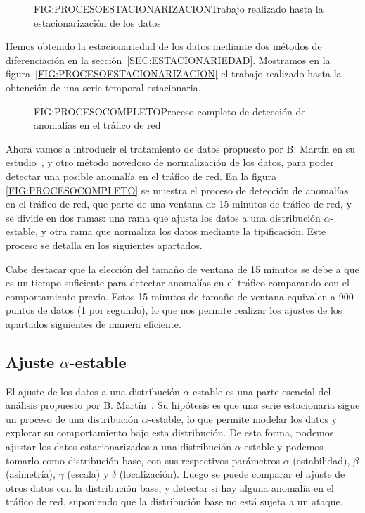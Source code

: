 
\begin{figure}[]{FIG:PROCESOESTACIONARIZACION}{Trabajo realizado hasta la estacionarización de los datos}
\end{figure}

Hemos obtenido la estacionariedad de los datos mediante dos métodos de diferenciación en la sección~\ref{SEC:ESTACIONARIEDAD}. Mostramos en la figura~\ref{FIG:PROCESOESTACIONARIZACION} el trabajo realizado hasta la obtención de una serie temporal estacionaria.

\begin{figure}[]{FIG:PROCESOCOMPLETO}{Proceso completo de detección de anomalías en el tráfico de red}
\end{figure}

Ahora vamos a introducir el tratamiento de datos propuesto por B. Martín en su estudio~\cite{benjamin2021}, y otro método novedoso de normalización de los datos, para poder detectar una posible anomalía en el tráfico de red. En la figura \ref{FIG:PROCESOCOMPLETO} se muestra el proceso de detección de anomalías en el tráfico de red, que parte de una ventana de 15 minutos de tráfico de red, y se divide en dos ramas: una rama que ajusta los datos a una distribución $\alpha$-estable, y otra rama que normaliza los datos mediante la tipificación. Este proceso se detalla en los siguientes apartados.

Cabe destacar que la elección del tamaño de ventana de 15 minutos se debe a que es un tiempo suficiente para detectar anomalías en el tráfico comparando con el comportamiento previo. Estos 15 minutos de tamaño de ventana equivalen a 900 puntos de datos (1 por segundo), lo que nos permite realizar los ajustes de los apartados siguientes de manera eficiente.


\subsection{Ajuste $\alpha$-estable}
El ajuste de los datos a una distribución $\alpha$-estable es una parte esencial del análisis propuesto por B. Martín~\cite{benjamin2021}. Su hipótesis es que una serie estacionaria sigue un proceso de una distribución $\alpha$-estable, lo que permite modelar los datos y explorar su comportamiento bajo esta distribución.
De esta forma, podemos ajustar los datos estacionarizados a una distribución $\alpha$-estable y podemos tomarlo como distribución base, con sus respectivos parámetros $\alpha$ (estabilidad), $\beta$ (asimetría), $\gamma$ (escala) y $\delta$ (localización).
Luego se puede comparar el ajuste de otros datos con la distribución base, y detectar si hay alguna anomalía en el tráfico de red, suponiendo que la distribución base no está sujeta a un ataque.

